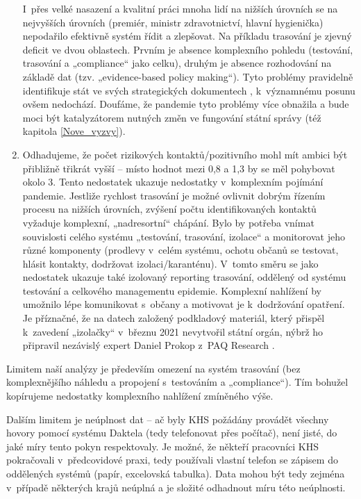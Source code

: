 \begin{enumerate}
I~přes velké nasazení a kvalitní práci mnoha lidí na nižších úrovních se na nejvyšších úrovních (premiér, ministr zdravotnictví, hlavní hygienička) nepodařilo efektivně systém řídit a zlepšovat. Na příkladu trasování je zjevný deficit ve dvou oblastech. Prvním je absence komplexního pohledu (testování, trasování a „compliance“ jako celku), druhým je absence rozhodování na základě dat (tzv. „evidence-based policy making“). Tyto problémy pravidelně identifikuje stát ve svých strategických dokumentech \cite{tr_MVCR, tr_MZP}, k~významnému posunu ovšem nedochází. Doufáme, že pandemie tyto problémy více obnažila a bude moci být katalyzátorem nutných změn ve fungování státní správy (též kapitola \ref{Nove_vyzvy}).
\item Odhadujeme, že počet rizikových kontaktů/pozitivního mohl mít ambici být přibližně třikrát vyšší -- místo hodnot mezi 0,8 a 1,3 by se měl pohybovat okolo 3. Tento nedostatek ukazuje nedostatky v~komplexním pojímání pandemie. Jestliže rychlost trasování je možné ovlivnit dobrým řízením procesu na nižších úrovních, zvýšení počtu identifikovaných kontaktů vyžaduje komplexní, „nadresortní“ chápání. Bylo by potřeba vnímat souvislosti celého systému „testování, trasování, izolace“ a monitorovat jeho různé komponenty (prodlevy v~celém systému, ochotu občanů se
testovat, hlásit kontakty, dodržovat izolaci/karanténu). V~tomto směru se jako nedostatek ukazuje také izolovaný reporting trasování, oddělený od systému testování a celkového managementu epidemie. Komplexní nahlížení by umožnilo
lépe komunikovat s~občany a motivovat je k~dodržování opatření. Je příznačné, že na datech založený podkladový materiál, který přispěl k~zavedení „izolačky“ \cite{tr_MPSV} v~březnu 2021 nevytvořil státní orgán, nýbrž ho připravil nezávislý expert Daniel Prokop z~PAQ Research \cite{tr_PAQ02}.
\end{enumerate}

Limitem naší analýzy je především omezení na systém trasování (bez komplexnějšího náhledu a propojení s~testováním a „compliance“). Tím bohužel ko\-pí\-ru\-je\-me nedostatky komplexního nahlížení zmíněného výše.

Dalším limitem je neúplnost dat -- ač byly KHS požádány provádět všechny hovory pomocí systému Daktela (tedy telefonovat přes počítač), není jisté, do jaké míry tento pokyn respektovaly. Je možné, že někteří pracovníci KHS pokračovali v~předcovidové praxi, tedy používali vlastní telefon se zápisem do oddělených systémů (papír, excelovská tabulka). Data mohou být tedy zejména v~případě některých krajů neúplná a je složité odhadnout míru této neúplnosti.

